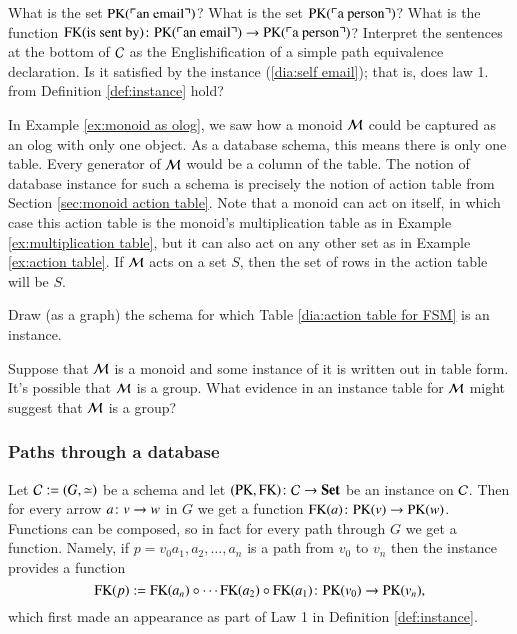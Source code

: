\begin{exercise}
\sexc What is the set $\PK(\fakebox{an email})$? 
\next What is the set $\PK(\fakebox{a person})$? 
\next What is the function $\FK(\tn{is sent by})\taking\PK(\fakebox{an email})\to\PK(\fakebox{a person})$?
\next Interpret the sentences at the bottom of $\mathcal{C}$ as the Englishification of a simple path equivalence declaration. Is it satisfied by the instance (\ref{dia:self email}); that is, does law 1. from Definition \ref{def:instance} hold?
\endsexc
\end{exercise}

\begin{example}\label{ex:monoid action table}

In Example \ref{ex:monoid as olog}, we saw how a monoid $\mathcal{M}$ could be captured as an olog with only one object. As a database schema, this means there is only one table. Every generator of $\mathcal{M}$ would be a column of the table. The notion of database instance for such a schema is precisely the notion of action table from Section \ref{sec:monoid action table}. Note that a monoid can act on itself, in which case this action table is the monoid's multiplication table as in Example \ref{ex:multiplication table}, but it can also act on any other set as in Example \ref{ex:action table}. If $\mathcal{M}$ acts on a set $S$, then the set of rows in the action table will be $S$.

\end{example}

\begin{exercise}
Draw (as a graph) the schema for which Table \ref{dia:action table for FSM} is an instance.
\end{exercise}

\begin{exercise}
Suppose that $\mathcal{M}$ is a monoid and some instance of it is written out in table form. It's possible that $\mathcal{M}$ is a group. What evidence in an instance table for $\mathcal{M}$ might suggest that $\mathcal{M}$ is a group? 
\end{exercise}


\subsubsection{Paths through a database}

Let $\mathcal{C}:=(G,\simeq)$ be a schema and let $(\PK,\FK)\taking\mcC\to\Set$ be an instance on $\mathcal{C}$. Then for every arrow $a\colon v\rightarrow w$ in $G$ we get a function $\FK(a)\taking\PK(v)\to\PK(w)$. Functions can be composed, so in fact for every path through $G$ we get a function. Namely, if $p=v_0a_1,a_2,\ldots,a_n$ is a path from $v_0$ to $v_n$ then the instance provides a function $$\FK(p):=\FK(a_n)\circ\cdots\FK(a_2)\circ\FK(a_1)\taking\PK(v_0)\to\PK(v_n),$$ which first made an appearance as part of Law 1 in Definition \ref{def:instance}.

